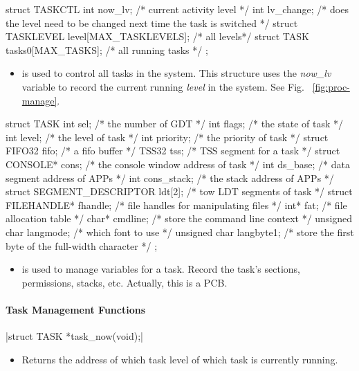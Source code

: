 \documentclass{swfcthesis}
\begin{document}
\begin{codeblock}[1]
\begin{ccode}
struct TASKCTL
{ 
  int now_lv;    /* current activity level */
  int lv_change; /* does the level need to be changed next time the task is switched */
  struct TASKLEVEL level[MAX_TASKLEVELS]; /* all levels*/
  struct TASK tasks0[MAX_TASKS];          /* all running tasks */
};
\end{ccode}
\end{codeblock}
\begin{itemize}
\item is used to control all tasks in the system. This structure uses the \emph{now\_lv}
  variable to record the current running \emph{level} in the system. See
  Fig. ~\ref{fig:proc-manage}.
  
  
\end{itemize}

\begin{codeblock}[1]
\begin{ccode}
struct TASK
{ 
  int sel;              /* the number of GDT */
  int flags;            /* the state of task */
  int level;            /* the level of task */
  int priority;         /* the priority of task */
  struct FIFO32 fifo;   /* a fifo buffer */
  TSS32 tss;            /* TSS segment for a task */
  struct CONSOLE* cons; /* the console window address of task */
  int ds_base;          /* data segment address of APPs */
  int cons_stack;       /* the stack address of APPs */
  struct SEGMENT_DESCRIPTOR ldt[2]; /* tow LDT segments of task */
  struct FILEHANDLE* fhandle; /* file handles for manipulating files */
  int* fat; /* file allocation table */
  char* cmdline; /* store the command line context */
  unsigned char langmode;  /* which font to use */
  unsigned char langbyte1; /* store the first byte of the full-width character */
};
\end{ccode}
\end{codeblock}
\begin{itemize}
\item is used to manage variables for a task. Record the task's sections, permissions,
  stacks, etc. Actually, this is a PCB.
\end{itemize}

\paragraph{Task Management Functions}

\csingle|struct TASK *task_now(void);|
\begin{itemize}
\item Returns the address of which task level of which task is currently running. 
    
\end{itemize}
\end{document}
